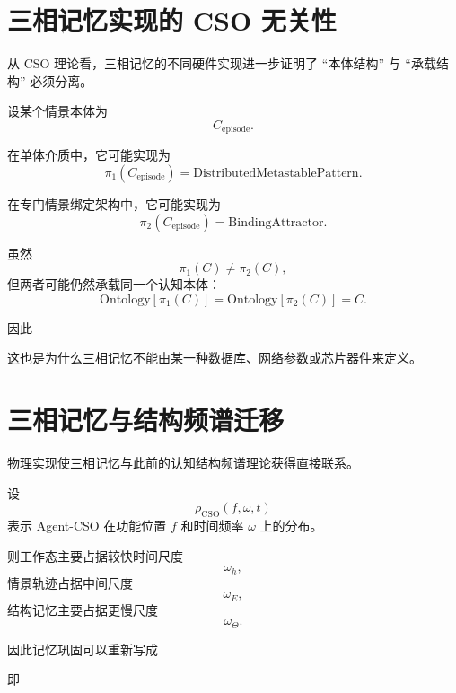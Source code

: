\section{三相记忆实现的 CSO 无关性}

从 CSO 理论看，三相记忆的不同硬件实现进一步证明了 ``本体结构'' 与 ``承载结构'' 必须分离。

设某个情景本体为
\[
C_{\mathrm{episode}}.
\]

在单体介质中，它可能实现为
\[
\pi_1(C_{\mathrm{episode}})
=
\mathrm{DistributedMetastablePattern}.
\]

在专门情景绑定架构中，它可能实现为
\[
\pi_2(C_{\mathrm{episode}})
=
\mathrm{BindingAttractor}.
\]

虽然
\[
\pi_1(C)\neq\pi_2(C),
\]
但两者可能仍然承载同一个认知本体：
\[
\boxed{
\mathrm{Ontology}[\pi_1(C)]
=
\mathrm{Ontology}[\pi_2(C)]
=
C.
}
\]

因此
\begin{statementbox}
\centering
{}
\end{statementbox}

这也是为什么三相记忆不能由某一种数据库、网络参数或芯片器件来定义。

\section{三相记忆与结构频谱迁移}

物理实现使三相记忆与此前的认知结构频谱理论获得直接联系。

设
\[
\rho_{\mathrm{CSO}}(f,\omega,t)
\]
表示 Agent-CSO 在功能位置 $f$ 和时间频率 $\omega$ 上的分布。

则工作态主要占据较快时间尺度
\[
\omega_h,
\]
情景轨迹占据中间尺度
\[
\omega_E,
\]
结构记忆主要占据更慢尺度
\[
\omega_\Theta.
\]

因此记忆巩固可以重新写成
\begin{statementbox}
\centering
{}
\end{statementbox}

即
\begin{statementbox}
\centering
{}
\end{statementbox}

